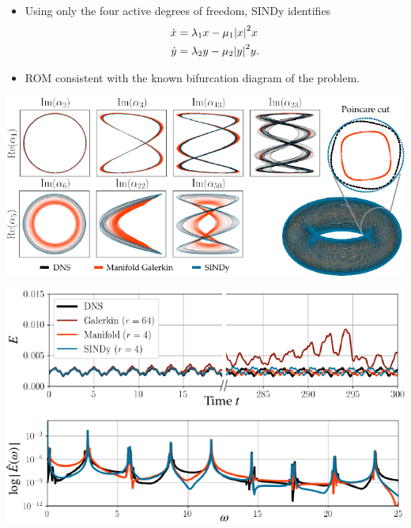 \documentclass[aspectratio=169,compress,12pt,dvipsnames]{beamer}
\begin{document}
\begin{frame}
    \vfill
    \begin{minipage}{.48\textwidth}
        \begin{itemize}
            \item Using only the four active degrees of freedom, SINDy identifies
            \[
            \begin{aligned}
                \dot{x} & = \lambda_1 x - \mu_1 \abs{x}^2 x \\
                \dot{y} & = \lambda_2 y - \mu_2 \abs{y}^2 y.
            \end{aligned}
            \]
            \item ROM consistent with the known bifurcation diagram of the problem.
        \end{itemize}
    \end{minipage}%
    \hfill
    \begin{minipage}{.48\textwidth}
        \centering
        \includegraphics[width=\textwidth]{imgs/sindy_attractor.png}
    \end{minipage}
    \vfill
\end{frame}

\begin{frame}
    \vfill
    \centering
    \includegraphics[width=.8\textwidth]{imgs/sindy_tke.png}
    \vfill
\end{frame}
\end{document}
